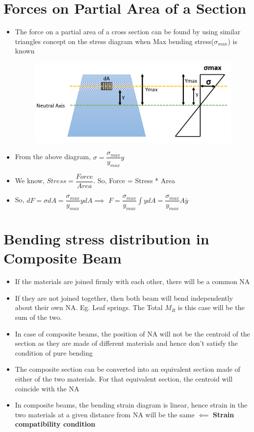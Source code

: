 \documentclass[8pt]{report}
\begin{document}
	\section{Forces on Partial Area of a Section}
		\begin{itemize}
			\item The force on a partial area of a cross section can be found by using similar triangles concept on the stress diagram when Max bending stress($\sigma_{max}$) is known
			\begin{figure}[H]
				\centering
				\includegraphics[scale=0.4]{forcepartial.png}
			\end{figure}
			\item From the above diagram, $\boxed{\sigma = \dfrac{\sigma_{max}}{y_{max}}y}$
			\item We know, $Stress=\dfrac{Force}{Area}$. So, Force = Stress * Area
			\item So, $dF = \sigma dA = \dfrac{\sigma_{max}}{y_{max}}ydA \implies$ $F = \dfrac{\sigma_{max}}{y_{max}}\int ydA = \boxed{\dfrac{\sigma_{max}}{y_{max}}A\bar{y}}$
		\end{itemize}\hrulefill
	\section{Bending stress distribution in Composite Beam}
		\begin{itemize}
			\item If the materials are joined firmly with each other, there will be a common NA
			\item If they are not joined together, then both beam will bend independently about their own NA. Eg. Leaf springs. The Total $M_R$ is this case will be the sum of the two. 
			\item In case of composite beams, the position of NA will not be the centroid of the section as they are made of different materials and hence don't satisfy the condition of pure bending
			\item The composite section can be converted into an equivalent section made of either of the two materials. For that equivalent section, the centroid will coincide with the NA
			\item In composite beams, the bending strain diagram is linear, hence strain in the two materials at a given distance from NA will be the same $\impliedby$ \textbf{Strain compatibility condition}
		\end{itemize}\hrulefill
\end{document}
